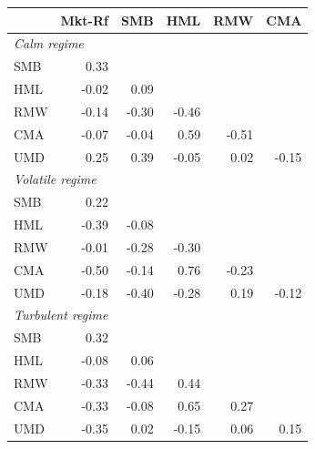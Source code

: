 \begin{tabular*}{\textwidth}{l@{\extracolsep{\fill}}rrrrr}
\toprule
 & Mkt-Rf & SMB & HML & RMW & CMA \\
\midrule
\multicolumn{6}{l}{\textit{Calm regime}} \\
\midrule
SMB & 0.33 &  &  &  &  \\
HML & -0.02 & 0.09 &  &  &  \\
RMW & -0.14 & -0.30 & -0.46 &  &  \\
CMA & -0.07 & -0.04 & 0.59 & -0.51 &  \\
UMD & 0.25 & 0.39 & -0.05 & 0.02 & -0.15 \\
\midrule
\multicolumn{6}{l}{\textit{Volatile regime}} \\
\midrule
SMB & 0.22 &  &  &  &  \\
HML & -0.39 & -0.08 &  &  &  \\
RMW & -0.01 & -0.28 & -0.30 &  &  \\
CMA & -0.50 & -0.14 & 0.76 & -0.23 &  \\
UMD & -0.18 & -0.40 & -0.28 & 0.19 & -0.12 \\
\midrule
\multicolumn{6}{l}{\textit{Turbulent regime}} \\
\midrule
SMB & 0.32 &  &  &  &  \\
HML & -0.08 & 0.06 &  &  &  \\
RMW & -0.33 & -0.44 & 0.44 &  &  \\
CMA & -0.33 & -0.08 & 0.65 & 0.27 &  \\
UMD & -0.35 & 0.02 & -0.15 & 0.06 & 0.15 \\
\bottomrule
\end{tabular*}
